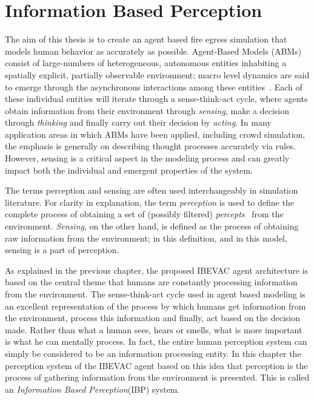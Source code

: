 
\chapter{Information Based Perception}
\label{chapter:IBP}
The aim of this thesis is to create an agent based fire egress simulation that models human behavior as accurately as possible. Agent-Based Models (ABMs) consist of large-numbers of heterogeneous, autonomous entities inhabiting a spatially explicit, partially observable environment; macro level dynamics are said to emerge through the asynchronous interactions among these entities~\cite{Bonabeau:2002um,Epstein:1999vn}. Each of these individual entities will iterate through a sense-think-act cycle, where agents obtain information from their environment through {\em sensing}, make a decision through {\em thinking} and finally carry out their decision by {\em acting}. In many application areas in which ABMs have been applied, including crowd simulation, the emphasis is generally on describing thought processes accurately via rules. However, sensing is a critical aspect in the modeling process and can greatly impact both the individual and emergent properties of the system. 

The terms perception and sensing are often used interchangeably in simulation literature. For clarity in explanation, the term {\em perception} is used to define the complete process of obtaining a set of (possibly filtered) \emph{percepts}~\cite{Russel:1995vi} from the environment. {\em Sensing}, on the other hand, is defined as the process of obtaining raw information from the environment; in this definition, and in this model, sensing is a part of perception. 

As explained in the previous chapter, the proposed IBEVAC agent architecture is based on the central theme that humans are constantly processing information from the environment. The sense-think-act cycle used in agent based modeling is an excellent representation of the process by which humans get information from the environment, process this information and finally, act based on the decision made. Rather than what a human sees, hears or smells, what is more important is what he can mentally process. In fact, the entire human perception system can simply be considered to be an information processing entity. In this chapter the perception system of the IBEVAC agent based on this idea that perception is the process of gathering information from the environment is presented. This is called an \emph{Information Based Perception}(IBP) system.

